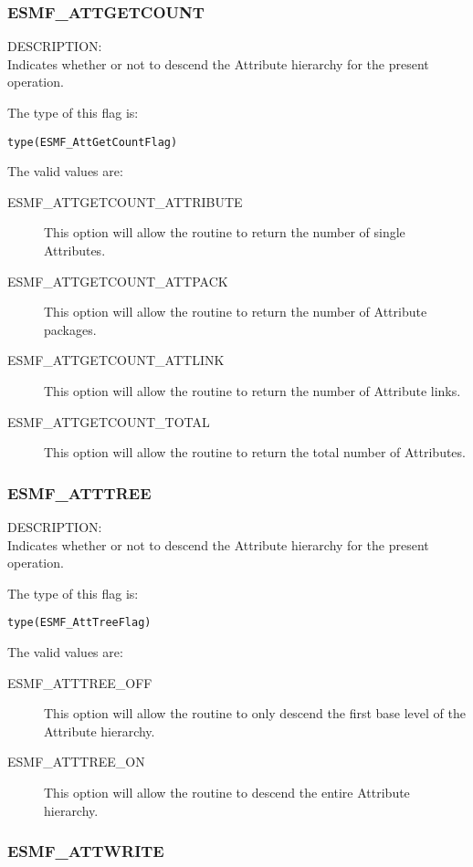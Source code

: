 
\subsubsection{ESMF\_ATTGETCOUNT}
\label{const:attgetcount}

{\sf DESCRIPTION:\\}
Indicates whether or not to descend the Attribute hierarchy for the present operation.

The type of this flag is:

{\tt type(ESMF\_AttGetCountFlag)}

The valid values are:
\begin{description}
	\item[ESMF\_ATTGETCOUNT\_ATTRIBUTE]
	This option will allow the routine to return the number of single Attributes.
	\item[ESMF\_ATTGETCOUNT\_ATTPACK]
	This option will allow the routine to return the number of Attribute packages.
	\item[ESMF\_ATTGETCOUNT\_ATTLINK]
	This option will allow the routine to return the number of Attribute links.
	\item[ESMF\_ATTGETCOUNT\_TOTAL]
	This option will allow the routine to return the total number of Attributes.
\end{description}

\subsubsection{ESMF\_ATTTREE}
\label{const:atttree}

{\sf DESCRIPTION:\\}
Indicates whether or not to descend the Attribute hierarchy for the present operation.

The type of this flag is:

{\tt type(ESMF\_AttTreeFlag)}

The valid values are:
\begin{description}
	\item[ESMF\_ATTTREE\_OFF]
	This option will allow the routine to only descend the first base level of the Attribute hierarchy.
	\item[ESMF\_ATTTREE\_ON]
	This option will allow the routine to descend the entire Attribute hierarchy.
\end{description}

\subsubsection{ESMF\_ATTWRITE}
\label{const:attwrite}

